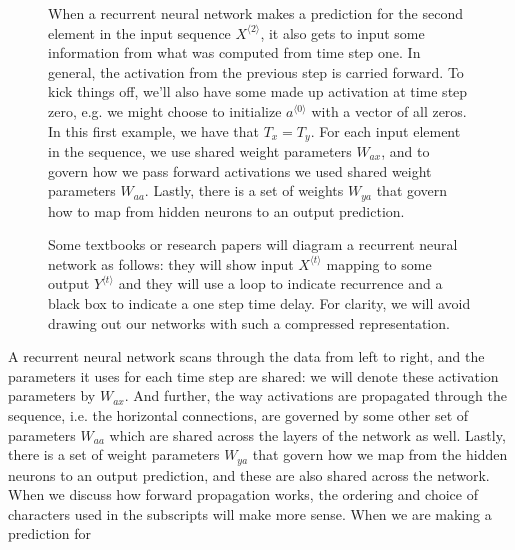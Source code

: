 \documentclass[12pt]{article}
\begin{document}
\begin{figure}[h]
\begin{tikzpicture}
  \end{tikzpicture}
  \caption{\footnotesize When a recurrent neural network makes a prediction for the second element in the input sequence $X^{\langle 2 \rangle}$, it also gets to input some information from what was computed from time step one. In general, the activation from the previous step is carried forward. To kick things off, we'll also have some made up activation at time step zero, e.g. we might choose to initialize $a^{\langle 0 \rangle}$ with a vector of all zeros. In this first example, we have that $T_x = T_y$. For each input element in the sequence, we use shared weight parameters $W_{ax}$, and to govern how we pass forward activations we used shared weight parameters $W_{aa}$. Lastly, there is a set of weights $W_{ya}$ that govern how to map from hidden neurons to an output prediction.}
\end{figure}
\begin{figure}[h]
  \centering
  \caption{\footnotesize Some textbooks or research papers will diagram a     recurrent neural network as follows: they will show input
    $X^{\langle t \rangle}$ mapping to some output $Y^{\langle t \rangle}$ and they will use a loop to indicate recurrence and a black box to indicate a one step time delay. For clarity, we will avoid drawing out our networks with such a compressed representation.}
\end{figure}
A recurrent neural network scans through the data from left to right, and the parameters it uses for each time step are shared: we will denote these activation parameters by $W_{ax}$. And further, the way activations are propagated through the sequence, i.e. the horizontal connections, are governed by some other set of parameters $W_{aa}$ which are shared across the layers of the network as well. Lastly, there is a set of weight parameters $W_{ya}$ that govern how we map from the hidden neurons to an output prediction, and these are also shared across the network. When we discuss how forward propagation works, the ordering and choice of characters used in the subscripts will make more sense. When we are making a prediction for
\end{document}
